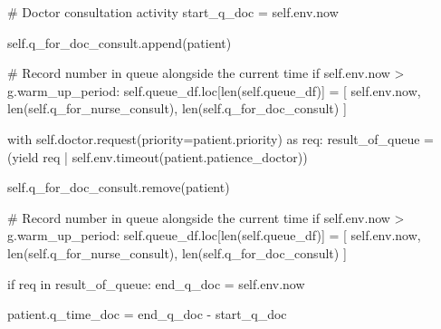 \documentclass[
  letterpaper,
  DIV=11,
  numbers=noendperiod]{scrreprt}
\newenvironment{Shaded}{}{}
\newcommand{\BuiltInTok}[1]{\textcolor[rgb]{0.84,0.23,0.29}{#1}}
\newcommand{\CommentTok}[1]{\textcolor[rgb]{0.42,0.45,0.49}{#1}}
\newcommand{\ControlFlowTok}[1]{\textcolor[rgb]{0.84,0.23,0.29}{#1}}
\newcommand{\ImportTok}[1]{\textcolor[rgb]{0.01,0.18,0.38}{#1}}
\newcommand{\KeywordTok}[1]{\textcolor[rgb]{0.84,0.23,0.29}{#1}}
\newcommand{\NormalTok}[1]{\textcolor[rgb]{0.14,0.16,0.18}{#1}}
\newcommand{\OperatorTok}[1]{\textcolor[rgb]{0.14,0.16,0.18}{#1}}
\newcommand{\VariableTok}[1]{\textcolor[rgb]{0.89,0.38,0.04}{#1}}
\begin{document}
\begin{tcolorbox}
\begin{Shaded}
\begin{Highlighting}[]
            \CommentTok{\# Doctor consultation activity}
\NormalTok{            start\_q\_doc }\OperatorTok{=} \VariableTok{self}\NormalTok{.env.now}

            \VariableTok{self}\NormalTok{.q\_for\_doc\_consult.append(patient)}

            \CommentTok{\# Record number in queue alongside the current time}
            \ControlFlowTok{if} \VariableTok{self}\NormalTok{.env.now }\OperatorTok{\textgreater{}}\NormalTok{ g.warm\_up\_period:}
                \VariableTok{self}\NormalTok{.queue\_df.loc[}\BuiltInTok{len}\NormalTok{(}\VariableTok{self}\NormalTok{.queue\_df)] }\OperatorTok{=}\NormalTok{ [}
                    \VariableTok{self}\NormalTok{.env.now,}
                    \BuiltInTok{len}\NormalTok{(}\VariableTok{self}\NormalTok{.q\_for\_nurse\_consult),}
                    \BuiltInTok{len}\NormalTok{(}\VariableTok{self}\NormalTok{.q\_for\_doc\_consult)}
\NormalTok{                ]}

            \ControlFlowTok{with} \VariableTok{self}\NormalTok{.doctor.request(priority}\OperatorTok{=}\NormalTok{patient.priority) }\ImportTok{as}\NormalTok{ req:}
\NormalTok{                result\_of\_queue }\OperatorTok{=}\NormalTok{ (}\ControlFlowTok{yield}\NormalTok{ req }\OperatorTok{|}
                                \VariableTok{self}\NormalTok{.env.timeout(patient.patience\_doctor))}

                \VariableTok{self}\NormalTok{.q\_for\_doc\_consult.remove(patient)}

                \CommentTok{\# Record number in queue alongside the current time}
                \ControlFlowTok{if} \VariableTok{self}\NormalTok{.env.now }\OperatorTok{\textgreater{}}\NormalTok{ g.warm\_up\_period:}
                    \VariableTok{self}\NormalTok{.queue\_df.loc[}\BuiltInTok{len}\NormalTok{(}\VariableTok{self}\NormalTok{.queue\_df)] }\OperatorTok{=}\NormalTok{ [}
                        \VariableTok{self}\NormalTok{.env.now,}
                        \BuiltInTok{len}\NormalTok{(}\VariableTok{self}\NormalTok{.q\_for\_nurse\_consult),}
                        \BuiltInTok{len}\NormalTok{(}\VariableTok{self}\NormalTok{.q\_for\_doc\_consult)}
\NormalTok{                    ]}

                \ControlFlowTok{if}\NormalTok{ req }\KeywordTok{in}\NormalTok{ result\_of\_queue:}
\NormalTok{                    end\_q\_doc }\OperatorTok{=} \VariableTok{self}\NormalTok{.env.now}

\NormalTok{                    patient.q\_time\_doc }\OperatorTok{=}\NormalTok{ end\_q\_doc }\OperatorTok{{-}}\NormalTok{ start\_q\_doc}


\end{Highlighting}
\end{Shaded}
\end{tcolorbox}
\end{document}
